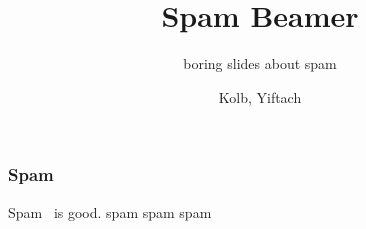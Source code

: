 \documentclass[final]{beamer}
\title{Spam Beamer}
\subtitle{boring slides about spam}
\author{Kolb, Yiftach}
\institute[FU and MPG]{
\centering
\vfill
{\texttt{[image: images/MPIMG\_RGB\_gruen.png]}} 
{\texttt{[image: images/fu-logo\_bildschirm\_RGB1.jpg]}}
}
\begin{document}
\begin{frame}
\frametitle{Spam}
\begin{block}
\maketitle
\end{block}
\begin{multicols}{2}
Spam~ is good.
spam spam spam
\lipsum[1]
\lipsum[2]
\end{multicols}
\end{frame}


\end{document}
